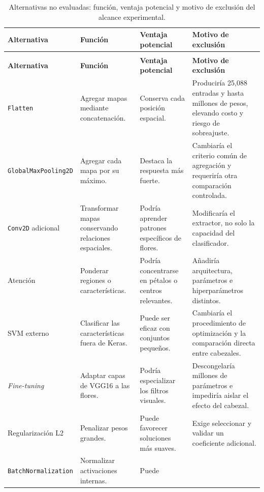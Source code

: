\documentclass[11pt,letterpaper]{article}
\begin{document}
\begingroup
\footnotesize
\setlength{\tabcolsep}{3pt}
\renewcommand{\arraystretch}{1.15}
\begin{longtable}{@{}>{\raggedright\arraybackslash}p{}
>{\raggedright\arraybackslash}p{}
>{\raggedright\arraybackslash}p{}
>{\raggedright\arraybackslash}p{}@{}}
\caption{Alternativas no evaluadas: función, ventaja potencial y motivo de
exclusión del alcance experimental.}\label{tab:alternativas}\\
\toprule
\textbf{Alternativa} & \textbf{Función} & \textbf{Ventaja potencial} &
\textbf{Motivo de exclusión}\\
\midrule
\endfirsthead
\multicolumn{4}{c}{\tablename\ \thetable{} (continuación)}\\
\toprule
\textbf{Alternativa} & \textbf{Función} & \textbf{Ventaja potencial} &
\textbf{Motivo de exclusión}\\
\midrule
\endhead
\bottomrule
\endfoot
\texttt{Flatten} & Agregar mapas mediante concatenación. & Conserva cada
posición espacial. & Produciría 25,088 entradas y hasta millones de pesos,
elevando costo y riesgo de sobreajuste.\\
\texttt{GlobalMax}\allowbreak\texttt{Pooling2D} & Agregar cada mapa por su máximo. & Destaca la
respuesta más fuerte. & Cambiaría el criterio común de agregación y requeriría
otra comparación controlada.\\
\texttt{Conv2D} adicional & Transformar mapas conservando relaciones
espaciales. & Podría aprender patrones específicos de flores. & Modificaría
el extractor, no solo la capacidad del clasificador.\\
Atención & Ponderar regiones o características. & Podría concentrarse en
pétalos o centros relevantes. & Añadiría arquitectura, parámetros e
hiperparámetros distintos.\\
SVM externo & Clasificar las características fuera de Keras. & Puede ser
eficaz con conjuntos pequeños. & Cambiaría el procedimiento de optimización y
la comparación directa entre cabezales.\\
\emph{Fine-tuning} & Adaptar capas de VGG16 a las flores. & Podría especializar
los filtros visuales. & Descongelaría millones de parámetros e impediría
aislar el efecto del cabezal.\\
Regularización L2 & Penalizar pesos grandes. & Puede favorecer soluciones más
suaves. & Exige seleccionar y validar un coeficiente adicional.\\
\texttt{Batch}\allowbreak\texttt{Normalization} & Normalizar activaciones internas. & Puede

\end{longtable}
\end{document}
